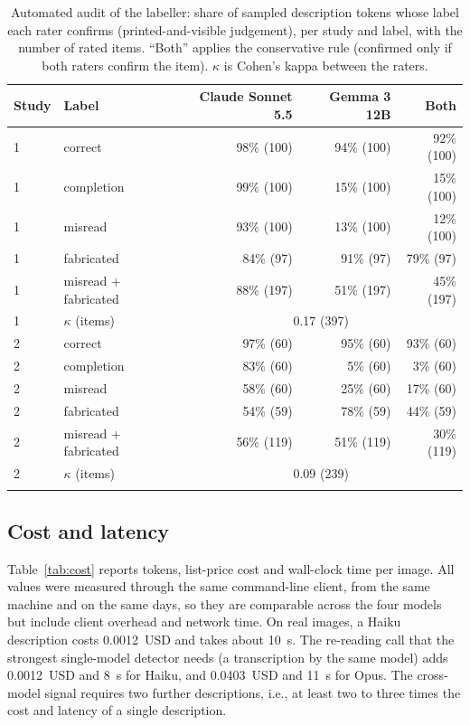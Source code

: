 \documentclass[pdflatex,sn-mathphys-num]{sn-jnl}%
\theoremstyle{thmstyleone}%
\theoremstyle{thmstyletwo}%
\theoremstyle{thmstylethree}%
\newcommand{\RealCostHaikuDesc}{0.0012}
\newcommand{\RealCostHaikuDescSec}{10}
\newcommand{\RealCostHaikuTrans}{0.0012}
\newcommand{\RealCostHaikuTransSec}{8}
\newcommand{\RealCostOpusTrans}{0.0403}
\newcommand{\RealCostOpusTransSec}{11}
\begin{document}
\begin{table}[!tbp]
\caption{Automated audit of the labeller: share of sampled description tokens whose label each rater confirms (printed-and-visible judgement), per study and label, with the number of rated items. ``Both'' applies the conservative rule (confirmed only if both raters confirm the item). $\kappa$ is Cohen's kappa between the raters.}\label{tab:audit}
\footnotesize
\begin{tabular*}{\textwidth}{@{\extracolsep\fill}llrrr}
\toprule
Study & Label & Claude Sonnet 5.5 & Gemma 3 12B & Both \\
\midrule
1 & correct & 98\% (100) & 94\% (100) & 92\% (100) \\
1 & completion & 99\% (100) & 15\% (100) & 15\% (100) \\
1 & misread & 93\% (100) & 13\% (100) & 12\% (100) \\
1 & fabricated & 84\% (97) & 91\% (97) & 79\% (97) \\
1 & misread + fabricated & 88\% (197) & 51\% (197) & 45\% (197) \\
1 & $\kappa$ (items) & \multicolumn{3}{c}{0.17 (397)} \\
\midrule
2 & correct & 97\% (60) & 95\% (60) & 93\% (60) \\
2 & completion & 83\% (60) & 5\% (60) & 3\% (60) \\
2 & misread & 58\% (60) & 25\% (60) & 17\% (60) \\
2 & fabricated & 54\% (59) & 78\% (59) & 44\% (59) \\
2 & misread + fabricated & 56\% (119) & 51\% (119) & 30\% (119) \\
2 & $\kappa$ (items) & \multicolumn{3}{c}{0.09 (239)} \\
\botrule
\end{tabular*}
\end{table}

\subsection{Cost and latency}\label{sec:cost}

Table~\ref{tab:cost} reports tokens, list-price cost and wall-clock time per image. All values were measured through the same command-line client, from the same machine and on the same days, so they are comparable across the four models but include client overhead and network time. On real images, a Haiku description costs \RealCostHaikuDesc{}~USD and takes about \RealCostHaikuDescSec{}~s. The re-reading call that the strongest single-model detector needs (a transcription by the same model) adds \RealCostHaikuTrans{}~USD and \RealCostHaikuTransSec{}~s for Haiku, and \RealCostOpusTrans{}~USD and \RealCostOpusTransSec{}~s for Opus. The cross-model signal requires two further descriptions, i.e., at least two to three times the cost and latency of a single description.
\end{document}
